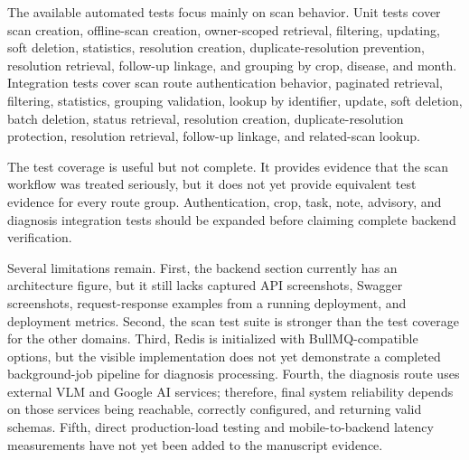 

The available automated tests focus mainly on scan behavior. Unit tests cover scan creation,
offline-scan creation, owner-scoped retrieval, filtering, updating, soft deletion, statistics,
resolution creation, duplicate-resolution prevention, resolution retrieval, follow-up linkage, and
grouping by crop, disease, and month. Integration tests cover scan route authentication behavior,
paginated retrieval, filtering, statistics, grouping validation, lookup by identifier, update,
soft deletion, batch deletion, status retrieval, resolution creation, duplicate-resolution
protection, resolution retrieval, follow-up linkage, and related-scan lookup.

\begin{table}[H]
\centering
\caption{Implemented backend test focus}
\label{tab:backend-test-focus}
\small
{}
\end{table}

The test coverage is useful but not complete. It provides evidence that the scan workflow was
treated seriously, but it does not yet provide equivalent test evidence for every route group.
Authentication, crop, task, note, advisory, and diagnosis integration tests should be expanded
before claiming complete backend verification.


Several limitations remain. First, the backend section currently has an architecture figure, but
it still lacks captured API screenshots, Swagger screenshots, request-response examples from a
running deployment, and deployment metrics. Second, the scan test suite is stronger than the test
coverage for the other domains. Third, Redis is initialized with BullMQ-compatible options, but the
visible implementation does not yet demonstrate a completed background-job pipeline for diagnosis
processing. Fourth, the diagnosis route uses external VLM and Google AI services; therefore, final
system reliability depends on those services being reachable, correctly configured, and returning
valid schemas. Fifth, direct production-load testing and mobile-to-backend latency measurements
have not yet been added to the manuscript evidence.

